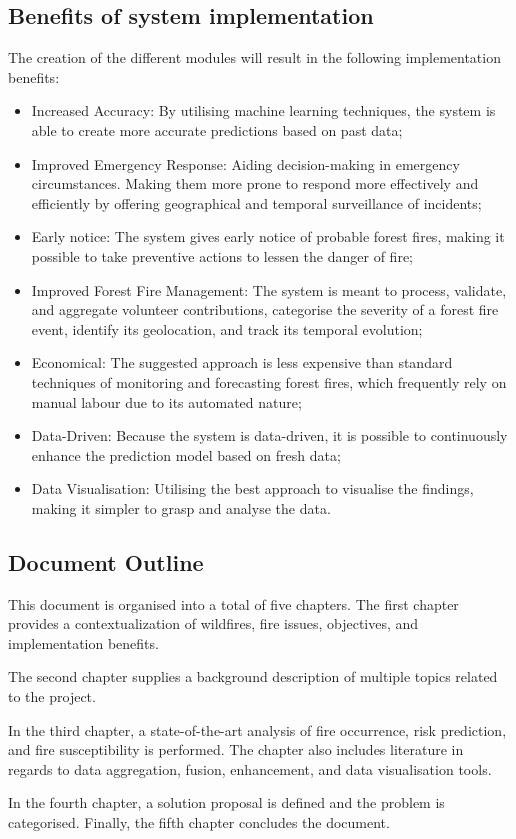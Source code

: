 \subsection{Benefits of system implementation}
The creation of the different modules will result in the following implementation benefits:
\begin{itemize}
    \item Increased Accuracy: By utilising machine learning techniques, the system is able to create more accurate predictions based on past data;
    \item Improved Emergency Response: Aiding decision-making in emergency circumstances. Making them more prone to respond more effectively and efficiently by offering geographical and temporal surveillance of incidents;
    \item Early notice: The system gives early notice of probable forest fires, making it possible to take preventive actions to lessen the danger of fire;
    \item Improved Forest Fire Management: The system is meant to process, validate, and aggregate volunteer contributions, categorise the severity of a forest fire event, identify its geolocation, and track its temporal evolution;
    \item Economical: The suggested approach is less expensive than standard techniques of monitoring and forecasting forest fires, which frequently rely on manual labour due to its automated nature;
    \item Data-Driven: Because the system is data-driven, it is possible to continuously enhance the prediction model based on fresh data;
    \item Data Visualisation: Utilising the best approach to visualise the findings, making it simpler to grasp and analyse the data.
\end{itemize}


\subsection{Document Outline}
This document is organised into a total of five chapters.
The first chapter provides a contextualization of wildfires, fire issues, objectives, and implementation benefits.


The second chapter supplies a background description of multiple topics related to the project.


In the third chapter, a state-of-the-art analysis of fire occurrence, risk prediction, and fire susceptibility is performed. The chapter also includes literature in regards to data aggregation, fusion, enhancement, and data visualisation tools.


In the fourth chapter, a solution proposal is defined and the problem is categorised. Finally, the fifth chapter concludes the document.


\cleardoublepage
\glsresetall